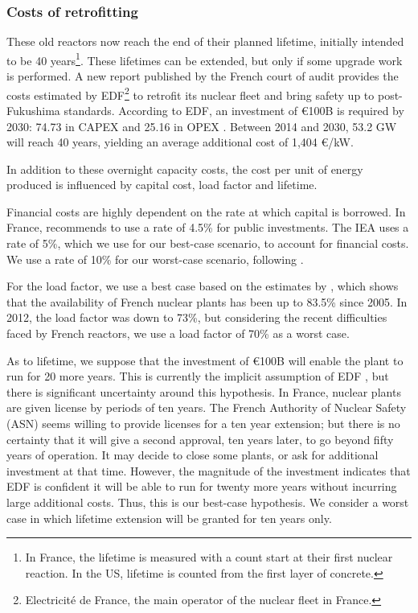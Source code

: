 \subsubsection{Costs of retrofitting}
These old reactors now reach the end of their planned lifetime, initially intended to be 40 years\footnote{
	In France, the lifetime is measured with a count start at their first nuclear reaction. In the US, lifetime is counted from the first layer of concrete.
}.
These lifetimes can be extended, but only if some upgrade work is performed. A new report published by the French court of audit \citep{CourdesComptes2016} provides the costs estimated by EDF\footnote{Electricité de France, the main operator of the nuclear fleet in France.} to retrofit its nuclear fleet and bring safety up to post-Fukushima standards. According to EDF, an investment of \euro 100B is required by 2030: 74.73 in CAPEX and 25.16 in OPEX \citep{CourdesComptes2016}.
Between 2014 and 2030, 53.2 GW will reach 40 years, yielding an average additional cost of 1,404 \euro/kW.

In addition to these overnight capacity costs, the cost per unit of energy produced is influenced by capital cost, load factor and lifetime.

Financial costs are highly dependent on the rate at which capital is borrowed. 
In France, \citet{Quinet2013} recommends to use a rate of 4.5\% for public investments.
The IEA uses a rate of 5\%, which we use for our best-case scenario, to account for financial costs.
We use a rate of 10\% for our worst-case scenario, following \citet{Boccard2014}.

For the load factor, we use a best case based on the estimates by \citet[p. 116]{CourdesComptes2016}, which shows that the availability of French nuclear plants has been up to 83.5\% since 2005. In 2012, the load factor was down to 73\%, but considering the recent difficulties faced by French reactors, we use a load factor of 70\% as a worst case.

As to lifetime, we suppose that the investment of \euro 100B will enable the plant to run for 20 more years. This is currently the implicit assumption of EDF \citep[p. 13]{AN2017}, but there is significant uncertainty around this hypothesis. In France, nuclear plants are given license by periods of ten years. 
The French Authority of Nuclear Safety (ASN) seems willing to provide licenses for a ten year extension; but there is no certainty that it will give a second approval, ten years later, to go beyond fifty years of operation. 
It may decide to close some plants, or ask for additional investment at that time. However, the magnitude of the investment indicates that EDF is confident it will be able to run for twenty more years without incurring large additional costs. Thus, this is our best-case hypothesis. We consider a worst case in which lifetime extension will be granted for ten years only. 


